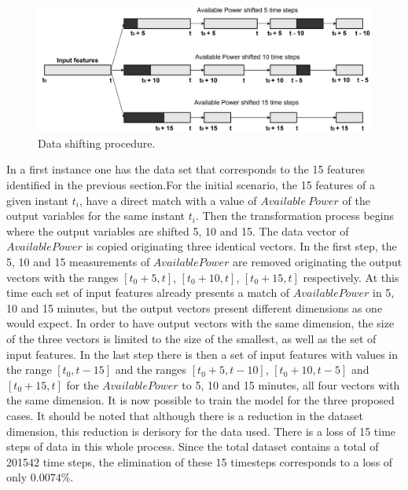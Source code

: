 \begin{figure}[h!]
    \centering
    \begin{center}
    \includegraphics[width=1\textwidth]{Images/Data Shift.png}
    \caption{Data shifting procedure.}
    \label{shifting}
    \end{center}
\end{figure}

In a first instance one has the data set that corresponds to the 15 features identified in the previous section.For the initial scenario, the 15 features of a given instant $t_i$, have a direct match with a value of $Available\ Power$ of the output variables for the same instant $t_i$.  Then the transformation process begins where the output variables are shifted 5, 10 and 15. The data vector of $Available Power$ is copied originating three identical vectors. In the first step, the 5, 10 and 15 measurements of $Available Power$ are removed originating the output vectors with the ranges $[t_0 + 5, t]$, $[t_0 + 10, t]$, $[t_0 + 15, t]$ respectively.  At this time each set of input features already presents a match of $Available Power$ in 5, 10 and 15 minutes, but the output vectors present different dimensions as one would expect. In order to have output vectors with the same dimension, the size of the three vectors is limited to the size of the smallest, as well as the set of input features. In the last step there is then a set of input features with values in the range $[t_0, t-15]$ and the ranges $[t_0 + 5, t-10]$, $[t_0 + 10, t-5]$ and $[t_0 + 15, t]$ for the $Available Power$ to 5, 10 and 15 minutes, all four vectors with the same dimension. It is now possible to train the model for the three proposed cases. It should be noted that although there is a reduction in the dataset dimension, this reduction is derisory for the data used. There is a loss of 15 time steps of data in this whole process. Since the total dataset contains a total of 201542 time steps, the elimination of these 15 timesteps corresponds to a loss of only $0.0074\%$.

